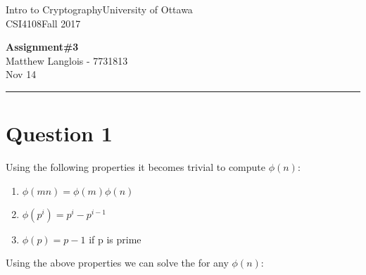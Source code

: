 \documentclass[fleqn, 12pt]{article}
\newcommand{\university}{University of Ottawa}
\newcommand{\name}{Matthew Langlois}
\newcommand{\studentNumber}{7731813}
\newcommand{\semester}{Fall 2017}
\newcommand{\assignmentType}{Assignment}
\newcommand{\assignmentNumber}{3}
\newcommand{\dueDate}{Nov 14}
\newcommand{\courseCode}{CSI4108}
\newcommand{\courseTitle}{Intro to Cryptography}
\newcommand{\essayTitle}{<Title>} %
\newcommand{\essaySubtitle}{<subtitle>} %
\newcommand{\essayAbstract}{} %
\newcommand{\beginassignemnt}{
    \newlength\tindent
    \setlength{\tindent}{\parindent}
    \setlength{\parindent}{0pt}

    \thispagestyle{assignment}
    \noindent
    \courseTitle \hfill \university\\
    \courseCode \hfill \semester
    \begin{center}
        \textbf{\assignmentType\text{ }\#\assignmentNumber}\\
        \name \hspace{1pt} - \studentNumber\\
        \dueDate\\
    \end{center}
    \vspace{6pt}
    \hrule
    \vspace{1.5\headsep}
}
\newcommand{\beginessay}{
    \nocite{*}

    \pagestyle{frontmatter}
    \pagenumbering{roman}

    \begin{center}
        \normalsize
        \textsc{\university}\\[5cm]
        \LARGE \textbf{\MakeUppercase{\essayTitle}}\\[0.5cm]
        \large \text{ }\essaySubtitle\text{ }\\[10cm] %
        \normalsize
        \textsc{\name}\\
        \textsc{\studentNumber}\\
        \textsc{\courseCode}\\
        \textsc{\semester}\\
        \textsc{\dueDate}
    \end{center}
    \thispagestyle{empty}

    \newpage
    \tableofcontents
    \newpage

    \iftotalfigures
        \addcontentsline{toc}{section}{\listfigurename}
        \listoffigures
    \fi
    \iftotaltables
        \addcontentsline{toc}{section}{\listtablename}
        \listoftables
    \fi

    \ifdefempty{\essayAbstract}{}{
        \newpage
        \addcontentsline{toc}{section}{Abstract}
        \begin{abstract}
            \essayAbstract
        \end{abstract}

    }
    \label{EndFrontMatter}
    \newpage

    \pagenumbering{arabic}
    \pagestyle{body}
}
\begin{document}
\beginassignemnt


\section*{Question 1}

Using the following properties it becomes trivial to compute $\phi(n)$:

\begin{enumerate}[1)]
    \item $\phi(mn) = \phi(m)\phi(n)$
    \item $\phi(p^i) = p^i - p^{i-1}$
    \item $\phi(p) = p -1$ if p is prime
\end{enumerate}

Using the above properties we can solve the for any $\phi(n)$:
\end{document}
